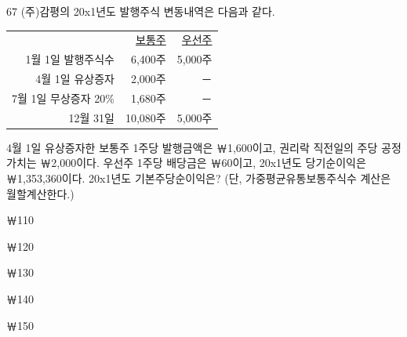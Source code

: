 \begin{question}{67}
(주)감평의 20x1년도 발행주식 변동내역은 다음과 같다.
\par{\small\centering
\begin{tabular}{@{}r@{\quad}r@{\quad}r@{}}
\hline
 & \uline{보통주} & \uline{우선주} \\
1월 1일 \quad 발행주식수 & 6,400주 & 5,000주 \\
4월 1일 \quad 유상증자 & 2,000주 & － \\
7월 1일 \quad 무상증자 20\% & 1,680주 & － \\
12월 31일 & 10,080주 & 5,000주 \\
\hline
\end{tabular}\par}
4월 1일 유상증자한 보통주 1주당 발행금액은 ￦1,600이고, 권리락 직전일의 주당 공정가치는 ￦2,000이다. 우선주 1주당 배당금은 ￦60이고, 20x1년도 당기순이익은 ￦1,353,360이다. 20x1년도 기본주당순이익은? (단, 가중평균유통보통주식수 계산은 월할계산한다.) \par
\begin{choices}
  \item ￦110
  \item ￦120
  \item ￦130
  \item ￦140
  \item ￦150
\end{choices}
\end{question}

